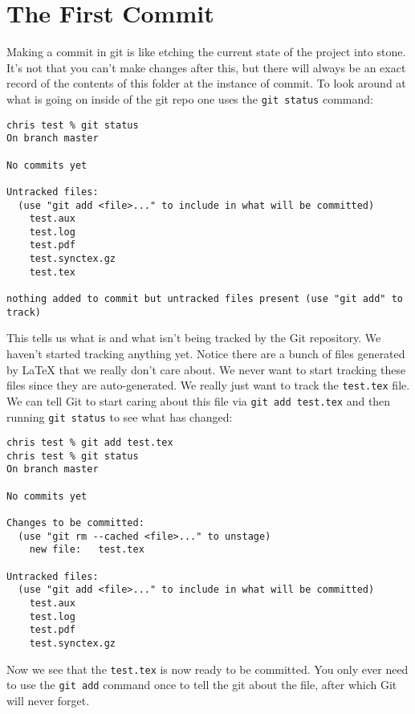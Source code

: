 \documentclass{article}
\begin{document}
\section{The First Commit}
Making a commit in git is like etching the current state of the
project into stone. It's not that you can't make changes after this,
but there will always be an exact record of the contents of this
folder at the instance of commit. To look
around at what is going on inside of the git repo one uses the
\lstinline{git status} command:
\begin{lstlisting}
chris test % git status
On branch master

No commits yet

Untracked files:
  (use "git add <file>..." to include in what will be committed)
	test.aux
	test.log
	test.pdf
	test.synctex.gz
	test.tex

nothing added to commit but untracked files present (use "git add" to track)
\end{lstlisting}
This tells us what is and what isn't being tracked by the Git
repository. We haven't started tracking anything yet. Notice there are
a bunch of files generated by LaTeX that we really don't care
about. We never want to start tracking these files since they are
auto-generated. We really just want to track the \lstinline{test.tex}
file. We can tell Git to start caring about this file via
\lstinline{git add test.tex} and then running \lstinline{git status}
to see what has changed:
\begin{lstlisting}
chris test % git add test.tex 
chris test % git status
On branch master

No commits yet

Changes to be committed:
  (use "git rm --cached <file>..." to unstage)
	new file:   test.tex

Untracked files:
  (use "git add <file>..." to include in what will be committed)
	test.aux
	test.log
	test.pdf
	test.synctex.gz
\end{lstlisting}
Now we see that the \lstinline{test.tex} is now ready to be
committed. You only ever need to use the \lstinline{git add} command
once to tell the git about the file, after which Git will never
forget.
\end{document}
